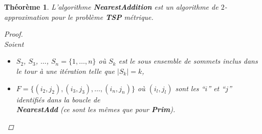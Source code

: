 \documentclass[12pt]{article}
\newcommand{\titre}[1]{\textcolor{title}{#1}}
\newtheorem{thm}{Th\'eor\`eme}[section]
\newtheorem{proof}{Preuve}[section]
\begin{document}
\begin{thm}
L'algorithme \textbf{NearestAddition} est un algorithme de $2$-approximation pour le problème \textbf{\titre{TSP}} métrique.
\begin{proof}$ $\\
Soient
\begin{itemize}
\item $S_2$, $S_3$, $\ldots$, $S_n=\{1,\ldots,n\}$ où $S_k$ est le sous ensemble de sommets inclus dans le tour à une itération telle que
$|S_k|=k$,
\item $F = \{ (i_2,j_2), (i_3,j_3), \ldots, (i_n,j_n)\}$ où $(i_l,j_l)$ sont les ``$i$'' et ``$j$'' identifiés dans la boucle de \\
\textbf{NearestAdd} \textit{(ce sont les mêmes que pour \textbf{Prim})}. \\
\end{itemize}


\end{proof}
\end{thm}
\end{document}
